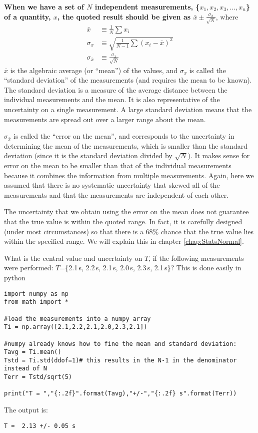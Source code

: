 \textbf{When we have a set of $N$ independent measurements, \{$x_1, x_2, x_3, \dots, x_n$\} of a quantity, $x$, the quoted result should be given as $\bar x \pm \frac{\sigma_{\bar x}}{\sqrt{N}}$}, where
\begin{align}
\label{eqn:MeanAndStd}
\bar x &\equiv \frac{1}{N}\sum x_i \nonumber\\
\sigma_x &\equiv \sqrt{\frac{1}{N-1}\sum (x_i-\bar x)^2}\nonumber\\
\sigma_{\bar x} &\equiv \frac{\sigma_x}{\sqrt{N}}
\end{align}
$\bar x$ is the algebraic average (or ``mean'') of the values, and $\sigma_x$ is called the ``standard deviation'' of the measurements (and requires the mean to be known). The standard deviation is a measure of the average distance between the individual measurements and the mean. It is also representative of the uncertainty on a single measurement. A large standard deviation means that the measurements are spread out over a larger range about the mean.

$\sigma_{\bar x}$ is called the ``error on the mean'', and corresponds to the uncertainty in determining the mean of the measurements, which is smaller than the standard deviation (since it is the standard deviation divided by $\sqrt{N}$). It makes sense for error on the mean to be smaller than that of the individual measurements because it combines the information from multiple measurements. Again, here we assumed that there is no systematic uncertainty that skewed all of the measurements and that the measurements are independent of each other.

The uncertainty that we obtain using the error on the mean does not guarantee that the true value is within the quoted range. In fact, it is carefully designed (under most circumstances) so that there is a 68\% chance that the true value lies within the specified range. We will explain this in chapter \ref{chap:StatsNormal}.

\begin{example}{0pt}{What is the central value and uncertainty on $T$, if the following measurements were performed: $T$=\{2.1\,s, 2.2\,s, 2.1\,s, 2.0\,s, 2.3\,s, 2.1\,s\}?}{}
\label{ex:ChapUncertainties_mean}
This is done easily in python
\begin{lstlisting}[frame=single] 
import numpy as np
from math import *

#load the measurements into a numpy array
Ti = np.array([2.1,2.2,2.1,2.0,2.3,2.1])

#numpy already knows how to fine the mean and standard deviation:
Tavg = Ti.mean()
Tstd = Ti.std(ddof=1)# this results in the N-1 in the denominator instead of N
Terr = Tstd/sqrt(5)

print("T = ","{:.2f}".format(Tavg),"+/-","{:.2f} s".format(Terr))
\end{lstlisting}
The output is:
\begin{verbatim}
T =  2.13 +/- 0.05 s
\end{verbatim}

\end{example}


